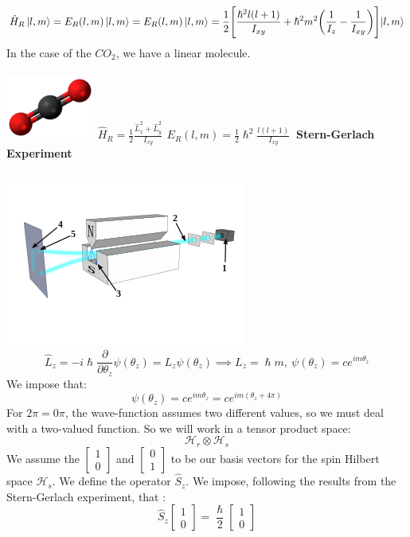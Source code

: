 \documentclass{article}
\begin{document}
$$\hat{H}_R \ket{l,m} = E_R(l,m) \ket{l,m} = E_R (l,m) \ket{l,m} = \frac{1}{2} \Biggl[ \frac{\hslash^2l(l+1)}{I_{xy}} + \hslash^2m^2 \biggl( \frac{1}{I_z} - \frac{1}{I_{xy}} \biggl) \Biggl] \ket{l,m}$$
In the case of the $CO_2$, we have a linear molecule.
\\ \\ 
\includegraphics[scale = 1]{co2.png} $\hat{H}_R = \frac{1}{2} \frac{\hat{L}_x^2+ \hat{L}_y^2}{I_{xy}} \, \ E_R(l,m) = \frac{1}{2} \hslash^2 \frac{l(l+1)}{I_{xy}} \ $ 
\newpage
\textbf{Stern-Gerlach Experiment} \\ \\ 
\includegraphics[scale = 0.7]{sge.png} \\ 
$$\hat{L}_z = -i \hslash \frac{\partial}{\partial \theta_z} \psi(\theta_z) = L_z \psi(\theta_z) \implies L_z = \hslash m, \ \psi(\theta_z) = c e^{im\theta_z}$$
We impose that:
$$\psi(\theta_z) = c e^{im\theta_z} = c e^{im(\theta_z+4\pi)}$$
For $2\pi = 0\pi$, the wave-function assumes two different values, so we must deal with a two-valued function.
So we will work in a tensor product space:
$$\mathcal{H}_r \otimes \mathcal{H}_s$$
We assume the $\begin{bmatrix} 1 \\ 0 \end{bmatrix}$ and $\begin{bmatrix} 0 \\ 1 \end{bmatrix}$ to be our basis vectors for the spin Hilbert space $\mathcal{H}_s$.
We define the operator $\hat{S}_z$.
We impose, following the results from the Stern-Gerlach experiment, that : 
$$\hat{S}_z \begin{bmatrix} 1 \\ 0 \end{bmatrix} = \frac{\hslash}{2} \begin{bmatrix} 1 \\ 0 \end{bmatrix}$$
\end{document}
